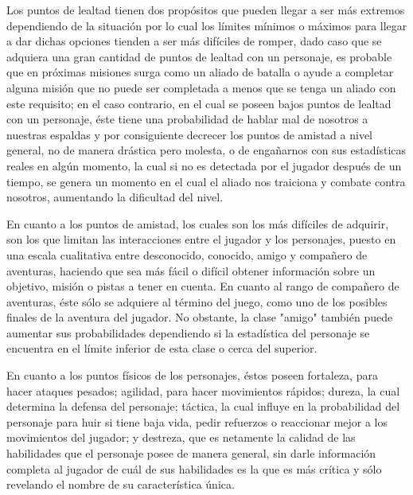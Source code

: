 \documentclass{article}
\begin{document}
Los puntos de lealtad tienen dos propósitos que pueden llegar a ser más extremos dependiendo de la situación por lo cual los límites mínimos o máximos para llegar a dar dichas opciones tienden a ser más difíciles de romper, dado caso que se adquiera una gran cantidad de puntos de lealtad con un personaje, es probable que en próximas misiones surga como un aliado de batalla o ayude a completar alguna misión que no puede ser completada a menos que se tenga un aliado con este requisito; en el caso contrario, en el cual se poseen bajos puntos de lealtad con un personaje, éste tiene una probabilidad de hablar mal de nosotros a nuestras espaldas y por consiguiente decrecer los puntos de amistad a nivel general, no de manera drástica pero molesta, o de engañarnos con sus estadísticas reales en algún momento, la cual si no es detectada por el jugador después de un tiempo, se genera un momento en el cual el aliado nos traiciona y combate contra nosotros, aumentando la dificultad del nivel.

En cuanto a los puntos de amistad, los cuales son los más difíciles de adquirir, son los que limitan las interacciones entre el jugador y los personajes, puesto en una escala cualitativa entre desconocido, conocido, amigo y compañero de aventuras, haciendo que sea más fácil o difícil obtener información sobre un objetivo, misión o pistas a tener en cuenta. En cuanto al rango de compañero de aventuras, éste sólo se adquiere al término del juego, como uno de los posibles finales de la aventura del jugador. No obstante, la clase "amigo" también puede aumentar sus probabilidades dependiendo si la estadística del personaje se encuentra en el límite inferior de esta clase o cerca del superior.

En cuanto a los puntos físicos de los personajes, éstos poseen fortaleza, para hacer ataques pesados; agilidad, para hacer movimientos rápidos; dureza, la cual determina la defensa del personaje; táctica, la cual influye en la probabilidad del personaje para huir si tiene baja vida, pedir refuerzos o reaccionar mejor a los movimientos del jugador; y destreza, que es netamente la calidad de las habilidades que el personaje posee de manera general, sin darle información completa al jugador de cuál de sus habilidades es la que es más crítica y sólo revelando el nombre de su característica única.



\end{document}
